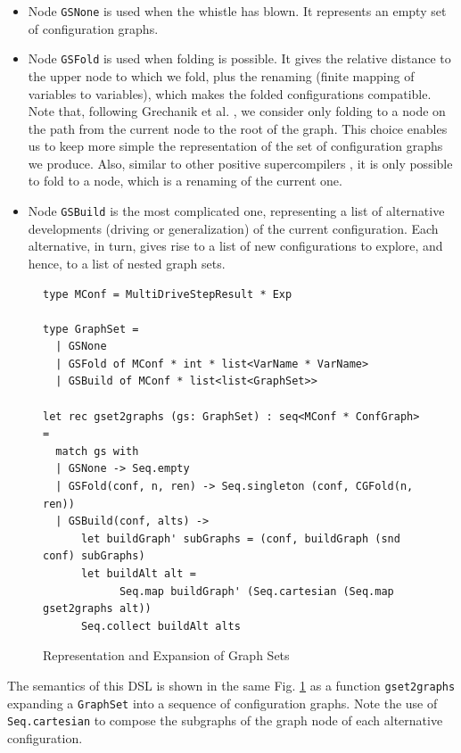 \documentclass[submission,copyright,creativecommons]{eptcs}
\begin{document}
\begin{itemize}
  \item Node \verb|GSNone| is used when the whistle has blown. 
    It represents an empty set of configuration graphs.
  \item Node \verb|GSFold| is used when folding is possible. 
    It gives the relative distance to the upper node to which we fold, 
    plus the renaming (finite mapping of variables to variables), which makes the folded configurations compatible.
    Note that, following Grechanik et al. \cite{Romanenko2014StagedMRSC}, we consider
    only folding to a node on the path from the current node to the root of the graph.
    This choice enables us to keep more simple the representation of the
    set of configuration graphs we produce.
    Also, similar to other positive supercompilers \cite{Sorensen1994TurchinSupercompiler,sorm98b,TMR/SCP2014},
    it is only possible to fold to a node, which is a renaming of the current one.
  \item Node \verb|GSBuild| is the most complicated one, representing a list
    of alternative developments (driving or generalization) of the current configuration.
    Each alternative, in turn, gives rise to a list of new configurations to explore,
    and hence, to a list of nested graph sets.
\end{itemize}

\begin{figure}
\begin{lstlisting}
type MConf = MultiDriveStepResult * Exp

type GraphSet =
  | GSNone
  | GSFold of MConf * int * list<VarName * VarName>
  | GSBuild of MConf * list<list<GraphSet>>

let rec gset2graphs (gs: GraphSet) : seq<MConf * ConfGraph> =
  match gs with
  | GSNone -> Seq.empty
  | GSFold(conf, n, ren) -> Seq.singleton (conf, CGFold(n, ren)) 
  | GSBuild(conf, alts) ->
      let buildGraph' subGraphs = (conf, buildGraph (snd conf) subGraphs)
      let buildAlt alt = 
            Seq.map buildGraph' (Seq.cartesian (Seq.map gset2graphs alt))
      Seq.collect buildAlt alts
\end{lstlisting}
\caption{Representation and Expansion of Graph Sets}
\label{fig:GraphSet}
\end{figure}

The semantics of this DSL is shown in the same Fig. \ref{fig:GraphSet} as
a function \verb|gset2graphs| expanding a \verb|GraphSet| into a sequence 
of configuration graphs.
Note the use of \verb|Seq.cartesian| to compose the subgraphs of 
the graph node of each alternative configuration.
\end{document}
